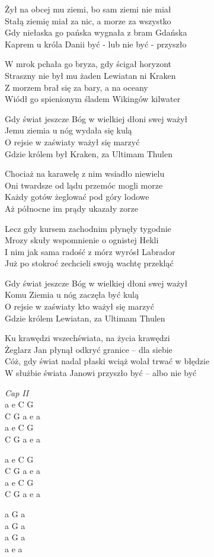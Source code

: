 \begin{text}
    \hfill\break
Żył na obcej mu ziemi, bo sam ziemi nie miał\\
Stałą ziemię miał za nic, a morze za wszystko\\
Gdy niełaska go pańska wygnała z bram Gdańska\\
Kaprem u króla Danii być - lub nie być - przyszło

W mrok pchała go bryza, gdy ścigał horyzont\\
Straszny nie był mu żaden Lewiatan ni Kraken\\
Z morzem brał się za bary, a na oceany\\
Wiódł go spienionym śladem Wikingów kilwater

Gdy świat jeszcze Bóg w wielkiej dłoni swej ważył\\
Jemu ziemia u nóg wydała się kulą\\
O rejsie w zaświaty ważył się marzyć\\
Gdzie królem był Kraken, za Ultimam Thulen

Chociaż na karawelę z nim wsiadło niewielu\\
Oni twardsze od lądu przemóc mogli morze\\
Każdy gotów żeglować pod góry lodowe\\
Aż północne im prądy ukazały zorze

Lecz gdy kursem zachodnim płynęły tygodnie\\
Mrozy skuły wspomnienie o ognistej Hekli\\
I nim jak sama radość z mórz wyrósł Labrador\\
Już po stokroć zechcieli swoją wachtę przekląć

Gdy świat jeszcze Bóg w wielkiej dłoni swej ważył\\
Komu Ziemia u nóg zaczęła być kulą\\
O rejsie w zaświaty kto ważył się marzyć\\
Gdzie królem Lewiatan, za Ultimam Thulen

Ku krawędzi wszechświata, na życia krawędzi\\
Żeglarz Jan płynął odkryć granice – dla siebie\\
Cóż, gdy świat nadal płaski wciąż wolał trwać w błędzie\\
W służbie świata Janowi przyszło być – albo nie być
\end{text}
\begin{chord}
    \textit{Cap II}\\
    a e C G\\
    C G a e a\\
    a e C G\\
    C G a e a

    a e C G\\
    C G a e a\\
    a e C G\\
    C G a e a

    a G a\\
    a G a\\
    a G a\\
    a e a
\end{chord}